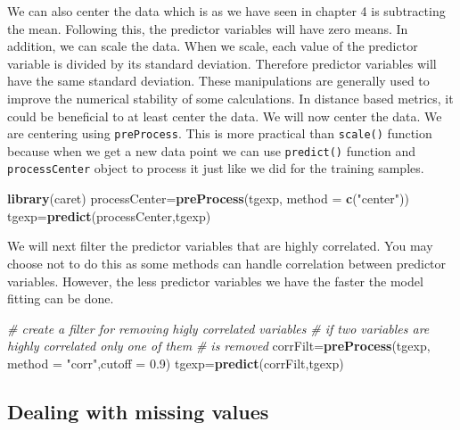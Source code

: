 \documentclass[12pt,]{krantz}
\newenvironment{Shaded}{\begin{snugshade}}{\end{snugshade}}
\newcommand{\CommentTok}[1]{\textcolor[rgb]{0.56,0.35,0.01}{\textit{#1}}}
\newcommand{\DataTypeTok}[1]{\textcolor[rgb]{0.13,0.29,0.53}{#1}}
\newcommand{\FloatTok}[1]{\textcolor[rgb]{0.00,0.00,0.81}{#1}}
\newcommand{\KeywordTok}[1]{\textcolor[rgb]{0.13,0.29,0.53}{\textbf{#1}}}
\newcommand{\NormalTok}[1]{#1}
\newcommand{\StringTok}[1]{\textcolor[rgb]{0.31,0.60,0.02}{#1}}
\begin{document}
We can also center the data which is as we have seen in chapter 4 is subtracting the mean. Following this, the predictor variables will have zero means. In addition, we can scale the data. When we scale, each value of the predictor
variable is divided by its standard deviation. Therefore predictor variables will have the same standard deviation. These manipulations are generally used to improve the numerical stability of some calculations. In distance based metrics, it could be beneficial to at least center the data. We will now center the data. We are centering using \texttt{preProcess}. This is more practical than \texttt{scale()} function because when we get a new data point we can use \texttt{predict()} function and \texttt{processCenter} object to process it just like we did for the training samples.

\begin{Shaded}
\begin{Highlighting}[]
\KeywordTok{library}\NormalTok{(caret)}
\NormalTok{processCenter=}\KeywordTok{preProcess}\NormalTok{(tgexp, }\DataTypeTok{method =} \KeywordTok{c}\NormalTok{(}\StringTok{"center"}\NormalTok{))}
\NormalTok{tgexp=}\KeywordTok{predict}\NormalTok{(processCenter,tgexp)}
\end{Highlighting}
\end{Shaded}

We will next filter the predictor variables that are highly correlated. You may choose not to do this as some methods can handle correlation between predictor variables. However, the less predictor variables we have the faster the model fitting can be done.

\begin{Shaded}
\begin{Highlighting}[]
\CommentTok{# create a filter for removing higly correlated variables}
\CommentTok{# if two variables are highly correlated only one of them}
\CommentTok{# is removed}
\NormalTok{corrFilt=}\KeywordTok{preProcess}\NormalTok{(tgexp, }\DataTypeTok{method =} \StringTok{"corr"}\NormalTok{,}\DataTypeTok{cutoff =} \FloatTok{0.9}\NormalTok{)}
\NormalTok{tgexp=}\KeywordTok{predict}\NormalTok{(corrFilt,tgexp)}
\end{Highlighting}
\end{Shaded}

\hypertarget{dealing-with-missing-values}{%
\subsection{Dealing with missing values}\label{dealing-with-missing-values}}
\end{document}
